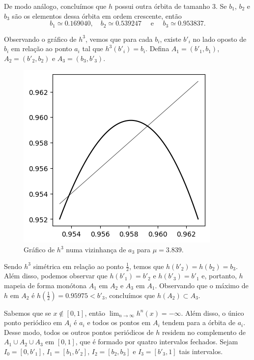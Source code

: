 De modo análogo, concluímos que $h$ possui outra órbita de tamanho $3$. Se $b_1$, $b_2$ e $b_3$ são os elementos dessa órbita em ordem crescente, então
$$b_1 \simeq 0.169040, \quad b_2 \simeq 0.539247 \quad  \text{ e } \quad b_3 \simeq 0.953837.$$

Observando o gráfico de $h^3$, vemos que para cada $b_i$, existe $b'_i$ no lado oposto de $b_i$ em relação ao ponto $a_i$ tal que $h^3(b'_i) = b_i$. Defina $A_1 = (b'_1, b_1)$, $A_2 = (b'_2, b_2)$ e $A_3 = (b_3, b'_3)$.

\begin{figure}[!htb]
\centering
\includegraphics[scale=0.6]{images/h_3,839(a_3).png}
\caption{Gráfico de $h^3$ numa vizinhança de $a_3$ para $\mu = 3.839$.}
\label{h_3,839(a_3)}
\end{figure}

Sendo $h^3$ simétrica em relação ao ponto $\frac{1}{2}$, temos que $h(b'_2) = h(b_2) = b_3$.
Além disso, podemos observar que $h(b'_1) = b'_2$ e $h(b'_3) = b'_1$ e, portanto, $h$ mapeia de forma monótona $A_1$ em $A_2$ e $A_3$ em $A_1$. Observando que o máximo de $h$ em $A_2$ é $h( \frac{1}{2}) = 0.95975 < b'_3$, concluímos que $h(A_2) \subset A_3$.

Sabemos que se $x \notin [0, 1]$, então $\lim_{n \to \infty} h^n(x) = -\infty$.
Além disso, o único ponto periódico em $A_i$ é $a_i$ e todos os pontos em $A_i$ tendem para a órbita de $a_i$.
Desse modo, todos os outros pontos periódicos de $h$ residem no complemento de $A_1 \cup A_2 \cup A_3$ em $[0, 1]$, que é formado por quatro intervalos fechados. Sejam $I_0 = [0, b'_1]$, $I_1 = [b_1, b'_2]$, $I_2 = [b_2, b_3]$ e $I_3 = [b'_3, 1]$ tais intervalos.

